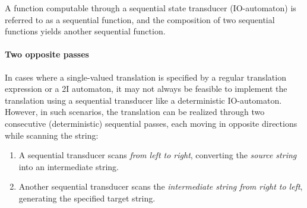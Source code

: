 A function computable through a sequential state transducer (IO-automaton) is referred to as a sequential function, and the composition of two sequential functions yields another sequential function.

\paragraph*{Two opposite passes}
In cases where a single-valued translation is specified by a regular translation expression or a 2I automaton, it may not always be feasible to implement the translation using a sequential transducer like a deterministic IO-automaton. 
However, in such scenarios, the translation can be realized through two consecutive (deterministic) sequential passes, each moving in opposite directions while scanning the string:
\begin{enumerate}
    \item A sequential transducer scans \textit{from left to right}, converting the \textit{source string} into an intermediate string.
    \item Another sequential transducer scans the \textit{intermediate string from right to left}, generating the specified target string.
\end{enumerate}